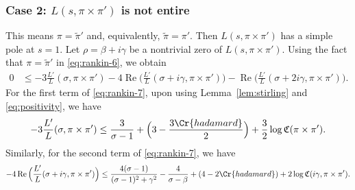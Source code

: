\documentclass[12pt,reqno]{amsart}
\renewcommand{\tilde}{\widetilde}
\theoremstyle{remark}
\renewcommand{\tilde}{\widetilde}
\DeclareMathOperator{\Real}{Re}
\renewcommand{\tilde}{\widetilde}
\numberwithin{equation}{section}
\begin{document}
    \subsubsection{Case 2:  
    \texorpdfstring{$L(s, \pi \times \pi')$}{L} is not entire}\label{subsubsec:not-entire}
    This means $\pi = \tilde{\pi}'$ and, equivalently, $\tilde{\pi} = \pi'$. Then $L(s, \pi \times \pi')$ has a simple pole at $s =1$. Let $\rho = \beta +i\gamma$ be a nontrivial zero of $L(s, \pi \times \pi')$.
    Using the fact that $\pi = \tilde{\pi}'$ in \eqref{eq:rankin-6}, we obtain
	\begin{equation}
		\label{eq:rankin-7}
		\begin{aligned}
			0 &\le -3\frac{L'}{L}(\sigma, \pi \times \pi') - 4\Real\Big(\frac{L'}{L}(\sigma + i\gamma, \pi \times \pi') \Big) -   \Real\Big(\frac{L'}{L}(\sigma + 2i\gamma, \pi \times \pi') \Big).
		\end{aligned}
	\end{equation}
    For the first term of \eqref{eq:rankin-7}, upon using Lemma~\ref{lem:stirling} and \eqref{eq:positivity}, we have
	\begin{equation}\label{eq:case4-term1}
		\begin{aligned}
			-3\frac{L'}{L}(\sigma, \pi \times \pi') \le \frac{3}{\sigma-1} + \Big(3-\frac{3\Cr{hadamard}}{2}\Big)+ \frac{3}{2}\log \mathfrak{C}(\pi \times \pi').
		\end{aligned}
	\end{equation}
	Similarly, for the second term of \eqref{eq:rankin-7}, we have
	\begin{multline}\label{eq:case4-term2}
			- 4\Real\Big(\frac{L'}{L}(\sigma + i\gamma, \pi \times \pi') \Big) \le \frac{4(\sigma-1)}{(\sigma-1)^2+\gamma^2} -\frac{4}{\sigma-\beta} +(4-2\Cr{hadamard})
            + 2\log \mathfrak{C}(i\gamma, \pi \times \pi').
	\end{multline}
\end{document}
